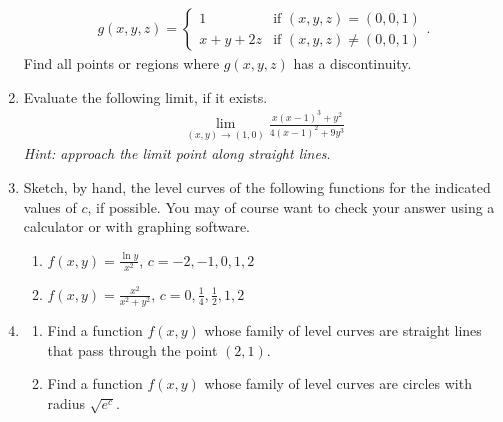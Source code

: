 \documentclass{article}
\begin{document}
\begin{enumerate}
\begin{align*}
g(x,y,z) = \left\{
\begin{array}{rl}
1 & \text{if } (x,y,z) = (0,0,1) \\
x + y + 2z & \text{if } (x,y,z) \ne (0,0,1) 
\end{array} \right. .
\end{align*}
Find all points or regions where $g(x,y,z)$ has a discontinuity.
\item 
Evaluate the following limit, if it exists.
\begin{align*} 
\lim_{(x,y)\rightarrow(1,0) } \frac{x(x-1)^3 + y^2}{4(x-1)^2+9y^3}
\end{align*}
 \textit{Hint: approach the limit point along straight lines}.
\item 
Sketch, by hand, the level curves of the following functions for the indicated values of $c$, if possible. You may of course want to check your answer using a calculator or with graphing software. 
\begin{enumerate}
\item $f(x,y) =\frac{\ln y}{x^2} $, $c=-2, - 1, 0 , 1 , 2$
\item $f(x,y) = \frac{x^2}{x^2+y^2}$, $c=0,\frac{1}{4},\frac{1}{2},1,2$
\end{enumerate}
\item 
\begin{enumerate}
\item Find a function $f(x,y)$ whose family of level curves are straight lines that pass through the point $(2,1)$.
\item Find a function $f(x,y)$ whose family of level curves are circles with radius $\sqrt{e^c}$. 
\end{enumerate}


\end{enumerate}
\end{document}
